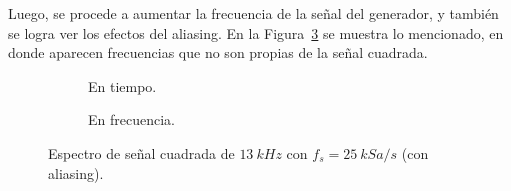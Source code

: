      Luego, se procede a aumentar la frecuencia de la señal del generador, y también se logra ver los efectos
      del aliasing. En la Figura~\ref{fig:Exp3SeñalCuadConAlias} se muestra lo mencionado, en donde aparecen
      frecuencias que no son propias de la señal cuadrada.

      \begin{figure}[H]
        \centering
        \begin{subfigure}[H]{0.48\textwidth}
          \caption{En tiempo.}
          \label{fig:Exp3AliasSeñalCuad1}
        \end{subfigure}
        \hfill 
        \begin{subfigure}[H]{0.44\textwidth}
          \caption{En frecuencia.}
          \label{fig:Exp3AliasSeñalCuad2}
        \end{subfigure}

        \caption{Espectro de señal cuadrada de $13~kHz$ con $f_s=25~kSa/s$ (con aliasing).}
        \label{fig:Exp3SeñalCuadConAlias}
      \end{figure}

